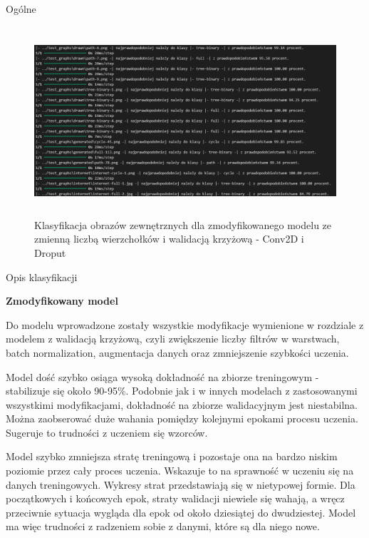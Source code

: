 Ogólne %

\begin{figure}[ht]
	\centering
	\includegraphics[height=7cm]{resources/tests/images/v4/multiple_edges_crossvalid_1_txt.png}
	\caption{Klasyfikacja obrazów zewnętrznych dla zmodyfikowanego modelu ze zmienną liczbą wierzchołków i walidacją krzyżową - Conv2D i Droput}
	\label{Fig:tests-var-2}
\end{figure}
\FloatBarrier

Opis klasyfikacji %

\textbf{Zmodyfikowany model}

Do modelu wprowadzone zostały wszystkie modyfikacje wymienione w rozdziale z modelem z walidacją krzyżową,
czyli zwiększenie liczby filtrów w warstwach, batch normalization, augmentacja danych oraz zmniejszenie szybkości uczenia.

Model dość szybko osiąga wysoką dokładność na zbiorze treningowym - stabilizuje się około 90-95\%.
Podobnie jak i w innych modelach z zastosowanymi wszystkimi modyfikacjami,
dokładność na zbiorze walidacyjnym jest niestabilna.
Można zaobserować duże wahania pomiędzy kolejnymi epokami procesu uczenia.
Sugeruje to trudności z uczeniem się wzorców.

Model szybko zmniejsza stratę treningową i pozostaje ona na bardzo niskim poziomie przez cały proces uczenia.
Wskazuje to na sprawność w uczeniu się na danych treningowych.
Wykresy strat przedstawiają się w nietypowej formie.
Dla początkowych i końcowych epok, straty walidacji niewiele się wahają,
a wręcz przeciwnie sytuacja wygląda dla epok od około dziesiątej do dwudziestej.
Model ma więc trudności z radzeniem sobie z danymi, które są dla niego nowe.

